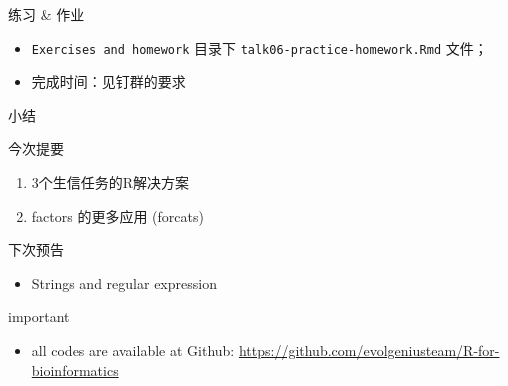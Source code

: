 \documentclass[ignorenonframetext,]{beamer}
\providecommand{\tightlist}{%
  \setlength{\itemsep}{0pt}\setlength{\parskip}{0pt}}
\begin{document}
\begin{frame}[fragile]{练习 \& 作业}
\protect\hypertarget{ux7ec3ux4e60-ux4f5cux4e1a}{}
\begin{itemize}
\item
  \texttt{Exercises\ and\ homework} 目录下
  \texttt{talk06-practice-homework.Rmd} 文件；
\item
  完成时间：见钉群的要求
\end{itemize}
\end{frame}

\begin{frame}{小结}
\protect\hypertarget{ux5c0fux7ed3}{}
\begin{block}{今次提要}
\protect\hypertarget{ux4ecaux6b21ux63d0ux8981}{}
\begin{enumerate}
\tightlist
\item
  3个生信任务的R解决方案
\item
  factors 的更多应用 (forcats)
\end{enumerate}
\end{block}

\begin{block}{下次预告}
\protect\hypertarget{ux4e0bux6b21ux9884ux544a}{}
\begin{itemize}
\tightlist
\item
  Strings and regular expression
\end{itemize}
\end{block}

\begin{block}{important}
\protect\hypertarget{important}{}
\begin{itemize}
\tightlist
\item
  all codes are available at Github:
  \url{https://github.com/evolgeniusteam/R-for-bioinformatics}
\end{itemize}
\end{block}
\end{frame}
\end{document}
